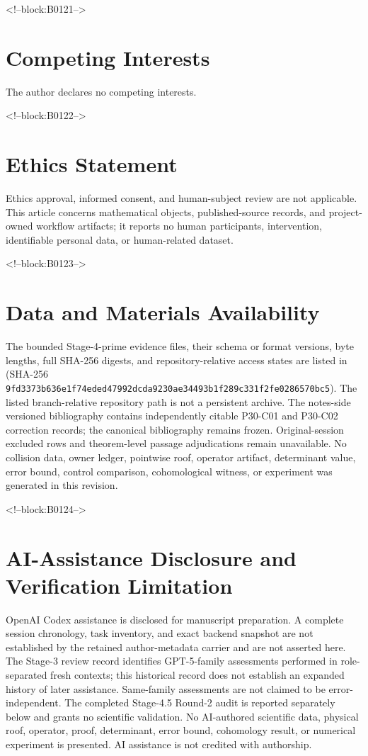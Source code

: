 \documentclass[11pt,a4paper]{article}
\begin{document}
<!--block:B0121-->
\section*{Competing Interests}
The author declares no competing interests.

<!--block:B0122-->
\section*{Ethics Statement}
Ethics approval, informed consent, and human-subject review are not applicable. This article concerns mathematical objects, published-source records, and project-owned workflow artifacts; it reports no human participants, intervention, identifiable personal data, or human-related dataset.

<!--block:B0123-->
\section*{Data and Materials Availability}
The bounded Stage-4-prime evidence files, their schema or format versions,
byte lengths, full SHA-256 digests, and repository-relative access states are
listed in 
(SHA-256 \texttt{9fd3373b636e1f74\allowbreak eded47992dcda923\allowbreak 0ae34493b1f289c3\allowbreak 31f2fe0286570bc5}).  The listed branch-relative repository path
is not a persistent archive.  The notes-side versioned bibliography contains
independently citable P30-C01 and P30-C02 correction records; the canonical
bibliography remains frozen.  Original-session excluded rows and theorem-level
passage adjudications remain unavailable.  No collision data, owner ledger,
pointwise roof, operator artifact, determinant value, error bound, control
comparison, cohomological witness, or experiment was generated in this revision.

<!--block:B0124-->
\section*{AI-Assistance Disclosure and Verification Limitation}
OpenAI Codex assistance is disclosed for manuscript preparation. A complete session chronology, task inventory, and exact backend snapshot are not established by the retained author-metadata carrier and are not asserted here. The Stage-3 review record identifies GPT-5-family assessments performed in role-separated fresh contexts; this historical record does not establish an expanded history of later assistance. Same-family assessments are not claimed to be error-independent. The completed Stage-4.5 Round-2 audit is reported separately below and grants no scientific validation. No AI-authored scientific data, physical roof, operator, proof, determinant, error bound, cohomology result, or numerical experiment is presented. AI assistance is not credited with authorship.
\end{document}
